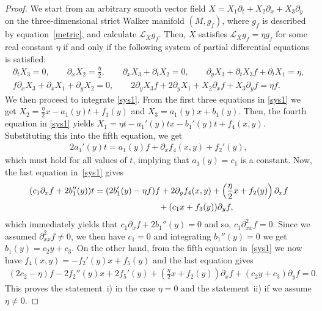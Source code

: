 \documentclass[pdftex]{sigma}
\numberwithin{equation}{section}
\begin{document}
\begin{proof}
We start from an arbitrary smooth vector f\/ield $X=X_1\partial_t+X_2\partial_x+X_3\partial_y$ on the three-dimensional strict Walker manifold $(M,g_f)$, where $g_f$ is described by equation~\eqref{metric}, and calculate $\mathcal L_Xg_f$. Then, $X$ satisf\/ies $\mathcal L_Xg_f=\eta g_f$ for some real constant $\eta$ if and only if the following system of partial dif\/ferential equations is satisf\/ied:
\begin{gather}
\partial_tX_3=0,\qquad \partial_xX_2=\frac\eta2,\qquad \partial_xX_3+\partial_tX_2=0,\qquad
\partial_yX_3+\partial_t X_3f+\partial_tX_1=\eta,\nonumber\\
 f\partial_xX_3+\partial_xX_1+\partial_yX_2=0,\qquad 2\partial_yX_3f+2\partial_yX_1+X_2\partial_xf+X_3\partial_yf=\eta f.\label{sys1}
\end{gather}
We then proceed to integrate \eqref{sys1}. From the f\/irst three equations in \eqref{sys1} we get $X_2=\frac\eta2x-a_1(y)t+f_1(y)$ and $X_3=a_1(y)x+b_1(y)$. Then, the fourth equation in \eqref{sys1} yields $X_1=\eta t-a_1 '(y) tx-b_1 '(y)t+f_4(x,y)$. Substituting this into the f\/ifth equation, we get
\begin{gather*}2a_1 '(y)t=a_1(y)f+\partial_xf_4(x,y)+f_2 '(y),\end{gather*}
which must hold for all values of $t${, implying} that $a_1(y)=c_1$ is a constant. Now, the last equation in~\eqref{sys1} gives
\begin{gather*}
(c_1\partial_xf+2b_1 ''(y))t =(2b_1 '(y)-\eta f)f+2\partial_yf_4(x,y)+\left(\frac\eta2 x+f_2(y)\right)\partial_xf \\
\hphantom{(c_1\partial_xf+2b_1 ''(y))t =}{} +(c_1x+f_3(y))\partial_yf,
\end{gather*}
which immediately yields that $c_1\partial_xf+2b_1 ''(y)=0$ and so, $c_1\partial_{xx}^2f=0$. Since we assumed $\partial_{xx}^2f\neq 0$, we then have $c_1=0$ and integrating $b_1 ''(y)=0$ we get $b_1(y)=c_2y+c_3$. On the other hand, from the f\/ifth equation in~\eqref{sys1} we now have $f_4(x,y)=-f_2 '(y)x+f_5(y)$ and the last equation gives
\begin{gather*}
(2c_2-\eta)f-2f_2 ''(y)x+2f_5 '(y)+\left(\frac\eta2 x+f_2(y)\right)\partial_xf+(c_2y+c_3)\partial_yf=0.
\end{gather*}
This proves the statement~i) in the case $\eta=0$ and the statement~ii) if we assume $\eta \neq 0$.


\end{proof}
\end{document}
